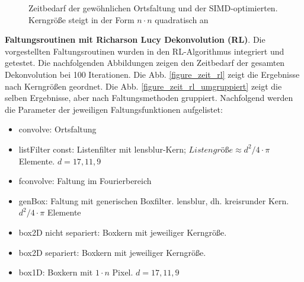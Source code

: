 \documentclass[a4paper,12pt]{article}
\begin{document}
\begin{figure}[htbp]
\caption{Zeitbedarf der gewöhnlichen Ortsfaltung und der SIMD-optimierten.
Kerngröße steigt in der Form $n \cdot n$ quadratisch an}%
\label{figure_simd_vs_con_quadtrat}
\end{figure}

\textbf{Faltungsroutinen mit Richarson Lucy Dekonvolution (RL)}.
Die vorgestellten Faltungsroutinen wurden in den RL-Algorithmus integriert und
getestet. Die nachfolgenden Abbildungen zeigen den Zeitbedarf der gesamten
Dekonvolution bei 100 Iterationen. Die Abb. \ref{figure_zeit_rl} zeigt die
Ergebnisse nach Kerngrößen geordnet. Die Abb. \ref{figure_zeit_rl_umgruppiert}
zeigt die selben Ergebnisse, aber nach Faltungsmethoden gruppiert. Nachfolgend
werden die Parameter der jeweiligen Faltungsfunktionen aufgelistet:
\begin{itemize}
  \itemsep -1pt
  \item convolve: Ortsfaltung
  \item listFilter const: Listenfilter mit lensblur-Kern; $Listengröße \approx
  d^{2}/4 \cdot \pi$ Elemente. $d = 17, 11,9$
  \item fconvolve: Faltung im Fourierbereich
  \item genBox: Faltung mit generischen Boxfilter. lensblur, dh. kreisrunder
  Kern. $d^{2}/4 \cdot \pi$ Elemente
  \item box2D nicht separiert: Boxkern mit jeweiliger Kerngröße.
  \item box2D separiert: Boxkern mit jeweiliger Kerngröße.
  \item box1D: Boxkern mit $1 \cdot n$ Pixel. $d = 17,11,9$
     
\end{itemize}
\end{document}
